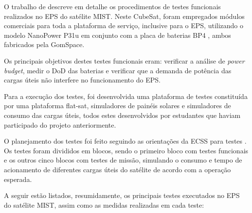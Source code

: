 O trabalho de \textcite{mist-eps} descreve em detalhe os procedimentos de testes funcionais realizados no \gls{EPS} do satélite MIST.
Neste CubeSat, foram empregados módulos comerciais para toda a plataforma de serviço, inclusive para o \gls{EPS}, utilizando o modelo NanoPower P31u \cite{p31u-datasheet} em conjunto com a placa de baterias BP4 \cite{bp4-datasheet}, ambos fabricados pela GomSpace.

Os principais objetivos destes testes funcionais eram: verificar a análise de \textit{power budget}, medir o \gls{DoD} das baterias e verificar que a demanda de potência das cargas úteis não interfere no funcionamento do \gls{EPS}.

Para a execução dos testes, foi desenvolvida uma plataforma de testes constituída por uma plataforma flat-sat, simuladores de painéis solares e simuladores de consumo das cargas úteis, todos estes desenvolvidos por estudantes que haviam participado do projeto anteriormente.

O planejamento dos testes foi feito seguindo as orientações da \gls{ECSS} para testes \cite{ecss-e-st-10-03}.
Os testes foram divididos em blocos, sendo o primeiro bloco com testes funcionais e os outros cinco blocos com testes de missão, simulando o consumo e tempo de acionamento de diferentes cargas úteis do satélite de acordo com a operação esperada.

A seguir estão listados, resumidamente, os principais testes executados no \gls{EPS} do satélite MIST, assim como as medidas realizadas em cada teste:

